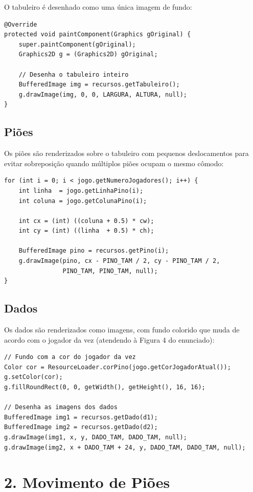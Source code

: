 \documentclass[12pt,a4paper]{report}
\begin{document}
O tabuleiro é desenhado como uma única imagem de fundo:

\begin{lstlisting}
@Override
protected void paintComponent(Graphics gOriginal) {
    super.paintComponent(gOriginal);
    Graphics2D g = (Graphics2D) gOriginal;

    // Desenha o tabuleiro inteiro
    BufferedImage img = recursos.getTabuleiro();
    g.drawImage(img, 0, 0, LARGURA, ALTURA, null);
}
\end{lstlisting}

\subsection{Piões}

Os piões são renderizados sobre o tabuleiro com pequenos deslocamentos para evitar sobreposição quando múltiplos piões ocupam o mesmo cômodo:

\begin{lstlisting}
for (int i = 0; i < jogo.getNumeroJogadores(); i++) {
    int linha  = jogo.getLinhaPino(i);
    int coluna = jogo.getColunaPino(i);

    int cx = (int) ((coluna + 0.5) * cw);
    int cy = (int) ((linha  + 0.5) * ch);

    BufferedImage pino = recursos.getPino(i);
    g.drawImage(pino, cx - PINO_TAM / 2, cy - PINO_TAM / 2,
                PINO_TAM, PINO_TAM, null);
}
\end{lstlisting}

\subsection{Dados}

Os dados são renderizados como imagens, com fundo colorido que muda de acordo com o jogador da vez (atendendo à Figura 4 do enunciado):

\begin{lstlisting}
// Fundo com a cor do jogador da vez
Color cor = ResourceLoader.corPino(jogo.getCorJogadorAtual());
g.setColor(cor);
g.fillRoundRect(0, 0, getWidth(), getHeight(), 16, 16);

// Desenha as imagens dos dados
BufferedImage img1 = recursos.getDado(d1);
BufferedImage img2 = recursos.getDado(d2);
g.drawImage(img1, x, y, DADO_TAM, DADO_TAM, null);
g.drawImage(img2, x + DADO_TAM + 24, y, DADO_TAM, DADO_TAM, null);
\end{lstlisting}

\section{2. Movimento de Piões}
\end{document}
